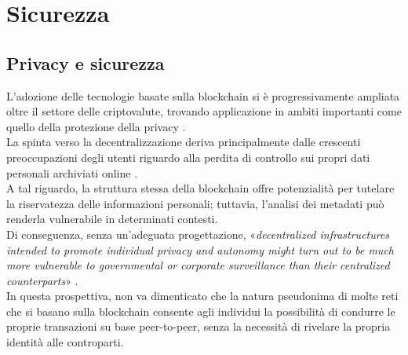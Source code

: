 \chapter{Sicurezza}
\section{Privacy e sicurezza}
L'adozione delle tecnologie basate sulla blockchain  si è progressivamente ampliata oltre il settore delle criptovalute, trovando applicazione in ambiti importanti come quello della protezione della privacy \cite{borroni_blockchain_2019}.
\\La spinta verso la decentralizzazione deriva principalmente dalle crescenti preoccupazioni degli utenti riguardo alla perdita di controllo sui propri dati personali archiviati online \cite{rodota_quattro_paradigmi_2018} \cite{alpa_identita_digitale_2017}.
\\A tal riguardo, la struttura stessa della blockchain offre potenzialità per tutelare la riservatezza delle informazioni personali; tuttavia, l'analisi dei metadati può renderla vulnerabile in determinati contesti. 
\\Di conseguenza, senza un'adeguata progettazione,
«\textit{decentralized infrastructures intended to promote individual privacy and autonomy might turn out to be much more vulnerable to governmental or corporate surveillance than their centralized counterparts}» \cite{de_filippi_interplay_2016}.
\\In questa prospettiva, non va dimenticato che la natura pseudonima di molte
reti che si basano sulla blockchain consente agli individui la possibilità di
condurre le proprie transazioni su base peer-to-peer, senza la necessità di
rivelare la propria identità alle controparti.

